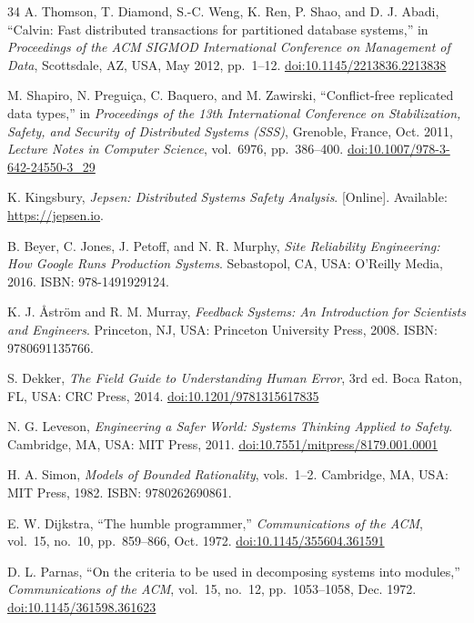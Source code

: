 \documentclass[conference]{IEEEtran}
\begin{document}
\begin{thebibliography}{34}
A. Thomson, T. Diamond, S.-C. Weng, K. Ren, P. Shao, and D. J. Abadi, ``Calvin: Fast distributed transactions for partitioned database systems,'' in \textit{Proceedings of the ACM SIGMOD International Conference on Management of Data}, Scottsdale, AZ, USA, May 2012, pp.~1--12.
\href{https://doi.org/10.1145/2213836.2213838}{doi:10.1145/2213836.2213838}

M. Shapiro, N. Preguiça, C. Baquero, and M. Zawirski, ``Conflict-free replicated data types,'' in \textit{Proceedings of the 13th International Conference on Stabilization, Safety, and Security of Distributed Systems (SSS)}, Grenoble, France, Oct. 2011, \textit{Lecture Notes in Computer Science}, vol.~6976, pp.~386--400.
\href{https://doi.org/10.1007/978-3-642-24550-3_29}{doi:10.1007/978-3-642-24550-3\_29}

K. Kingsbury, \textit{Jepsen: Distributed Systems Safety Analysis}. [Online]. Available:
\url{https://jepsen.io}.

B. Beyer, C. Jones, J. Petoff, and N. R. Murphy, \textit{Site Reliability Engineering: How Google Runs Production Systems}. Sebastopol, CA, USA: O'Reilly Media, 2016.
ISBN: 978-1491929124.

K. J. \AA str\"om and R. M. Murray, \textit{Feedback Systems: An Introduction for Scientists and Engineers}. Princeton, NJ, USA: Princeton University Press, 2008.
ISBN: 9780691135766.

S. Dekker, \textit{The Field Guide to Understanding Human Error}, 3rd ed. Boca Raton, FL, USA: CRC Press, 2014.
\href{https://doi.org/10.1201/9781315617835}{doi:10.1201/9781315617835}

N. G. Leveson, \textit{Engineering a Safer World: Systems Thinking Applied to Safety}. Cambridge, MA, USA: MIT Press, 2011.
\href{https://doi.org/10.7551/mitpress/8179.001.0001}{doi:10.7551/mitpress/8179.001.0001}

H. A. Simon, \textit{Models of Bounded Rationality}, vols.~1--2. Cambridge, MA, USA: MIT Press, 1982.
ISBN: 9780262690861.

E. W. Dijkstra, ``The humble programmer,'' \textit{Communications of the ACM}, vol.~15, no.~10, pp.~859--866, Oct. 1972.
\href{https://doi.org/10.1145/355604.361591}{doi:10.1145/355604.361591}

D. L. Parnas, ``On the criteria to be used in decomposing systems into modules,'' \textit{Communications of the ACM}, vol.~15, no.~12, pp.~1053--1058, Dec. 1972.
\href{https://doi.org/10.1145/361598.361623}{doi:10.1145/361598.361623}


\end{thebibliography}
\end{document}
